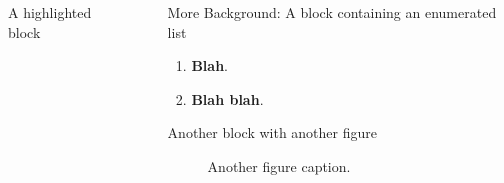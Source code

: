 \documentclass[final]{beamer}
\newlength{\sepwidth}
\newlength{\colwidth}
\newcommand{\separatorcolumn}{\begin{column}{\sepwidth}\end{column}}
\begin{document}
\begin{frame}[t]
\begin{columns}[t]
\begin{column}{\colwidth}
\begin{alertblock}{A highlighted block}
                \lipsum[1]

            \end{alertblock}

        \end{column}

        \separatorcolumn

        \begin{column}{\colwidth}

            \begin{block}{More Background: A block containing an enumerated list}

                \lipsum[1]

                \begin{enumerate}
                    \item \textbf{Blah}.
                    \item \textbf{Blah blah}.
                \end{enumerate}

            \end{block}

            \begin{block}{Another block with another figure}

                \lipsum[1]

                \begin{figure}
                    \centering
                    \caption{Another figure caption.}
                \end{figure}

                \lipsum[1]

            \end{block}

        \end{column}


\end{columns}
\end{frame}
\end{document}
